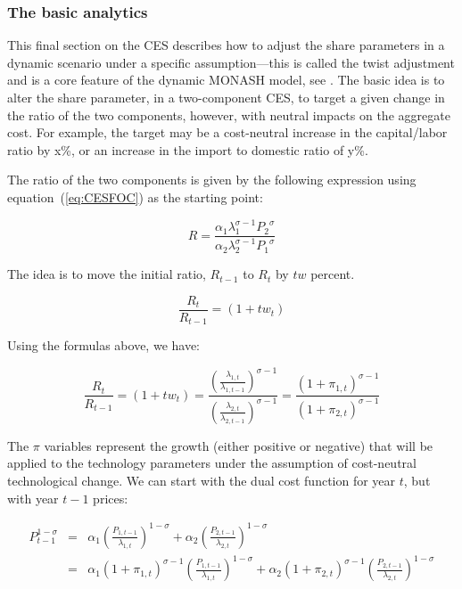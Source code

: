 \subsubsection{The basic analytics}

This final section on the CES describes how to adjust the share parameters in a dynamic scenario
under a specific assumption---this is called the twist adjustment and is a core feature of the
dynamic MONASH model, see \cite{DixonRimmer2002}. The basic idea is to alter the share parameter,
in a two-component CES, to target a given change in the ratio of the two components,
however, with neutral impacts on the aggregate cost. For example, the target may be a
cost-neutral increase in the capital/labor ratio by x\%, or an increase in the import to
domestic ratio of y\%.

The ratio of the two components is given by the following expression using
equation~(\ref{eq:CESFOC}) as the starting point:

\begin{displaymath}
R=\frac{{{\alpha }_{1}}\lambda _{1}^{\sigma -1}{{P}_{2}}^{\sigma }}{{{\alpha
}_{2}}\lambda _{2}^{\sigma -1}{{P}_{1}}^{\sigma }}
\end{displaymath}

The idea is to move the initial ratio, $R_{t-1}$ to $R_t$ by $tw$ percent.

\begin{displaymath}
\frac{{{R}_{t}}}{{{R}_{t-1}}}=(1+t{{w}_{t}})
\end{displaymath}

Using the formulas above, we have:

\begin{displaymath}
\frac{{{R}_{t}}}{{{R}_{t-1}}}=(1+t{{w}_{t}})=\frac{{{\left( \frac{{{\lambda
}_{1,t}}}{{{\lambda }_{1,t-1}}} \right)}^{\sigma -1}}}{{{\left( \frac{{{\lambda
}_{2,t}}}{{{\lambda }_{2,t-1}}} \right)}^{\sigma -1}}}=\frac{{{\left( 1+{{\pi }_{1,t}}
\right)}^{\sigma -1}}}{{{\left( 1+{{\pi }_{2,t}} \right)}^{\sigma -1}}}
\end{displaymath}

The $\pi$ variables represent the growth (either positive or negative) that will be applied to the
technology parameters under the assumption of cost-neutral technological change. We can
start with the dual cost function for year $t$, but with year $t-1$ prices:

\begin{displaymath}
\begin{array}{*{35}{l}}
P_{t-1}^{1-\sigma } & = &{{\alpha }_{1}}{{\left( \frac{{{P}_{1,t-1}}}{{{\lambda }_{1,t}}}
\right)}^{1-\sigma }}+{{\alpha }_{2}}{{\left( \frac{{{P}_{2,t-1}}}{{{\lambda }_{2,t}}}
\right)}^{1-\sigma }} \\
{} & = & {{\alpha }_{1}}{{(1+{{\pi }_{1,t}})}^{\sigma -1}}{{\left(
\frac{{{P}_{1,t-1}}}{{{\lambda }_{1,t}}} \right)}^{1-\sigma }}+{{\alpha
}_{2}}{{(1+{{\pi }_{2,t}})}^{\sigma -1}}{{\left( \frac{{{P}_{2,t-1}}}{{{\lambda
}_{2,t}}} \right)}^{1-\sigma }} \\
\end{array}
\end{displaymath}

